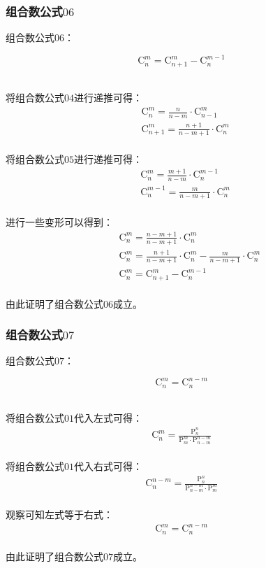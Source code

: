 \documentclass[UTF8]{ctexart}
\newcommand{\Pe}{\mathrm{P}}
\newcommand{\Co}{\mathrm{C}}
\begin{document}
\subsubsection{组合数公式$06$}
    组合数公式$06$：
    \begin{large}
        \begin{equation*}
            \Co_n^m=\Co_{n+1}^m-\Co_n^{m-1}
        \end{equation*}
    \end{large}\\
    将组合数公式$04$进行递推可得：
    \setcounter{equation}{0}
    \begin{align}
        &\Co_n^m=\frac{n}{n-m}\cdot\Co_{n-1}^m\\[3mm]
        &\Co_{n+1}^m=\frac{n+1}{n-m+1}\cdot\Co_{n}^m
    \end{align}\\
    将组合数公式$05$进行递推可得：
    \begin{align}
        &\Co_n^m=\frac{m+1}{n-m}\cdot\Co_n^{m-1}\\[3mm]
        &\Co_n^{m-1}=\frac{m}{n-m+1}\cdot\Co_n^{m}
    \end{align}\\
    进行一些变形可以得到：
    \begin{align}
        &~~~~\Co_n^m=\frac{n-m+1}{n-m+1}\cdot\Co_n^m\\[3mm]
        &~~~~\Co_n^m=\frac{n+1}{n-m+1}\cdot\Co_n^m-\frac{m}{n-m+1}\cdot\Co_n^m\\[3mm]
        &~~~~\Co_n^m=\Co_{n+1}^m-\Co_n^{m-1}
    \end{align}\\
    由此证明了组合数公式$06$成立。

\newpage

\subsubsection{组合数公式$07$}
    组合数公式$07$：
    \begin{large}
        \begin{equation*}
            \Co_n^m=\Co_n^{n-m}
        \end{equation*}
    \end{large}\\
    将组合数公式$01$代入左式可得：
    \setcounter{equation}{0}
    \begin{align}
        \Co_n^m=\frac{\Pe_n^n}{\Pe_m^m\cdot\Pe_{n-m}^{n-m}}
    \end{align}\\
    将组合数公式$01$代入右式可得：
    \begin{align}
        \Co_n^{n-m}=\frac{\Pe_n^n}{\Pe_{n-m}^{n-m}\cdot\Pe_m^m}
    \end{align}\\
    观察可知左式等于右式：
    \begin{align}
        \Co_n^m=\Co_n^{n-m}
    \end{align}\\
    由此证明了组合数公式$07$成立。
\end{document}

